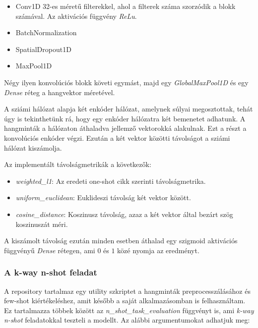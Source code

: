 \begin{itemize}
	\item Conv1D 32-es méretű filterekkel, ahol a filterek száma szorzódik a blokk számával. Az aktivációs függvény \emph{ReLu}.
	\item BatchNormalization
	\item SpatialDropout1D
	\item MaxPool1D
\end{itemize}

Négy ilyen konvolúciós blokk követi egymást, majd egy \emph{GlobalMaxPool1D} és egy \emph{Dense} réteg a hangvektor méretével.

A sziámi hálózat alapja két enkóder hálózat, amelynek súlyai megosztottak, tehát úgy is tekinthetünk rá, hogy egy enkóder hálózatra két bemenetet adhatunk. A hangminták a hálózaton áthaladva jellemző vektorokká alakulnak. Ezt a részt a konvolúciós enkóder végzi. Ezután a két vektor közötti távolságot a sziámi hálózat kiszámolja.

Az implementált távolságmetrikák a következők:

\begin{itemize}
	\item \emph{weighted\_l1}: Az eredeti one-shot cikk szerinti távolságmetrika.
	\item \emph{uniform\_euclidean}: Euklideszi távolság két vektor között.
	\item \emph{cosine\_distance}: Koszinusz távolság, azaz a két vektor által bezárt szög koszinuszát méri.
\end{itemize}

A kiszámolt távolság ezután minden esetben áthalad egy szigmoid aktivációs függvényű \emph{Dense} rétegen, ami $0$ és $1$ közé nyomja az eredményt.

\subsubsection{A k-way n-shot feladat}

A repository tartalmaz egy utility szkriptet a hangminták preprocesszálásához és few-shot kiértékeléshez, amit később a saját alkalmazásomban is felhasználtam. Ez tartalmazza többek között az \emph{n\_shot\_task\_evaluation} függvényt is, ami \emph{k-way n-shot} feladatokkal teszteli a modellt. Az alábbi argumentumokat adhatjuk meg:

